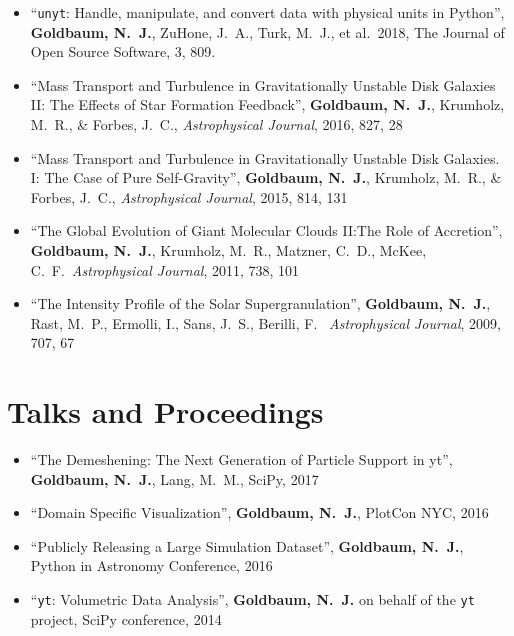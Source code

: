 \documentclass[10pt,letterpaper]{article}
\begin{document}
\begin{itemize}
  \item[] ``\texttt{unyt}: Handle, manipulate, and convert data with physical
    units in Python'', {\bf Goldbaum, N.~J.}, ZuHone, J.~A., Turk, M.~J., et
    al.\ 2018, The Journal of Open Source Software, 3, 809.
  \item[] ``Mass Transport and Turbulence in Gravitationally Unstable Disk
    Galaxies II:\@
    The Effects of Star Formation Feedback'', {\bf Goldbaum, N.~J.}, Krumholz, M.~R., \& Forbes,
    J.~C., {\it Astrophysical Journal}, 2016, 827, 28
  \item[] ``Mass Transport and Turbulence in Gravitationally Unstable Disk
    Galaxies. I:\@
    The Case of Pure Self-Gravity'', {\bf Goldbaum, N.~J.}, Krumholz, M.~R., \& Forbes,
    J.~C., {\it Astrophysical Journal}, 2015, 814, 131
  \item[] ``The Global Evolution of Giant Molecular Clouds II:\@ The Role of
    Accretion'', {\bf Goldbaum, N.~J.}, Krumholz, M.~R., Matzner, C.~D., McKee,
    C.~F.\ {\it Astrophysical Journal}, 2011, 738, 101
  \item[] ``The Intensity Profile of the Solar Supergranulation'', {\bf Goldbaum,
      N.~J.}, Rast, M.~P., Ermolli, I., Sans, J.~S., Berilli, F.\ {\it
      Astrophysical Journal}, 2009, 707, 67

\end{itemize}

\section*{Talks and Proceedings}

\begin{itemize}
\item[] ``The Demeshening: The Next Generation of Particle Support in yt'',
  {\bf Goldbaum, N.~J.}, Lang, M.~M., SciPy, 2017
\item[] ``Domain Specific Visualization'', {\bf Goldbaum, N.~J.}, PlotCon NYC,
  2016
\item[] ``Publicly Releasing a Large Simulation Dataset'', {\bf Goldbaum,
    N.~J.}, Python in Astronomy Conference, 2016
\item[] ``\texttt{yt}: Volumetric Data Analysis'', {\bf Goldbaum, N.~J.} on
  behalf of the \texttt{yt} project, SciPy conference, 2014

\end{itemize}
\end{document}
